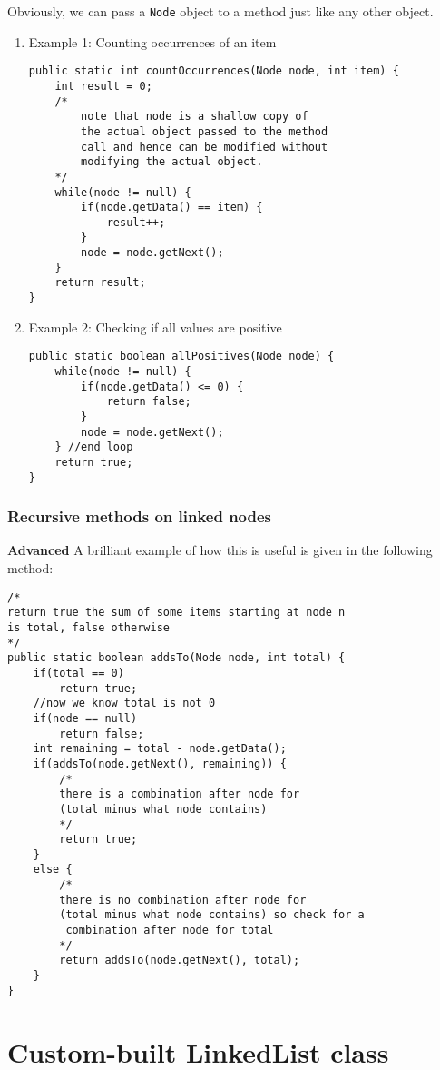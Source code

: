 \newpage

Obviously, we can pass a \texttt{Node} object to a method just like any other object.

\begin{enumerate}
\item Example 1: Counting occurrences of an item
\begin{lstlisting}
public static int countOccurrences(Node node, int item) {
	int result = 0;
	/*
		note that node is a shallow copy of 
		the actual object passed to the method 
		call and hence can be modified without
		modifying the actual object. 
	*/
	while(node != null) { 
		if(node.getData() == item) {
			result++;
		}
		node = node.getNext();
	}
	return result;
}	
\end{lstlisting}

\item Example 2: Checking if all values are positive
\begin{lstlisting}
public static boolean allPositives(Node node) {
	while(node != null) { 
		if(node.getData() <= 0) {
			return false;
		}
		node = node.getNext();
	} //end loop
	return true;
}	
\end{lstlisting}
\end{enumerate}

\newpage

\subsubsection{Recursive methods on linked nodes}

\textbf{Advanced} A brilliant example of how this is useful is given in the following method:

\begin{lstlisting}
/*
return true the sum of some items starting at node n
is total, false otherwise
*/
public static boolean addsTo(Node node, int total) {
	if(total == 0)
		return true;	
	//now we know total is not 0
	if(node == null) 
		return false;
	int remaining = total - node.getData();
	if(addsTo(node.getNext(), remaining)) {
		/*
		there is a combination after node for 
		(total minus what node contains)
		*/
		return true;
	}
	else {
		/*
		there is no combination after node for
		(total minus what node contains) so check for a
		 combination after node for total
		*/
		return addsTo(node.getNext(), total);
	}	
}	
\end{lstlisting}

\section{Custom-built LinkedList class}

